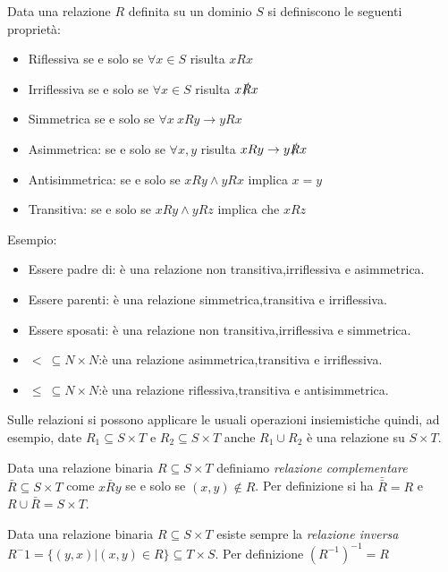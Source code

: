 Data una relazione $R$ definita su un dominio $S$ si definiscono le seguenti proprietà:
\begin{itemize}
  \item Riflessiva se e solo se $\forall x \in S$ risulta  $xRx$
  \item Irriflessiva se e solo se $\forall x \in S$ risulta $x \slashed{R} x$
  \item Simmetrica se e solo se $\forall x \ xRy \rightarrow yRx$
  \item Asimmetrica: se e solo se $\forall x,y$ risulta $xRy \rightarrow y \slashed{R} x$
  \item Antisimmetrica: se e solo se $xRy \land yRx$ implica $x = y$
  \item Transitiva: se e solo se $xRy \land yRz$ implica che $xRz$
\end{itemize}

Esempio:
\begin{itemize}
    \item Essere padre di: è una relazione non transitiva,irriflessiva e asimmetrica.
    \item Essere parenti: è una relazione simmetrica,transitiva e irriflessiva.
    \item Essere sposati: è una relazione non transitiva,irriflessiva e simmetrica.
    \item $< \ \subseteq N \times N$:è una relazione asimmetrica,transitiva e irriflessiva.
    \item $\leq \ \subseteq N \times N$:è una relazione riflessiva,transitiva e antisimmetrica.
\end{itemize}


Sulle relazioni si possono applicare le usuali operazioni insiemistiche quindi, ad esempio,
date $R_1 \subseteq S \times T$ e $R_2 \subseteq S \times T$ anche $R_1 \cup R_2$ è una relazione su $S \times T$.

Data una relazione binaria $R \subseteq S \times T$ definiamo \emph{relazione complementare}
$\bar{R} \subseteq S \times T$ come $x \bar{R} y$ se e solo se $(x,y) \not \in R$.
Per definizione si ha $\bar{\bar{R}} = R$ e $R \cup \bar{R} = S \times T$.

Data una relazione binaria $R \subseteq S \times T$ esiste sempre la \emph{relazione inversa}
$R^-1 = \{(y,x) | (x,y) \in R\} \subseteq T \times S$.
Per definizione $(R ^ {-1}) ^ {-1} = R$
